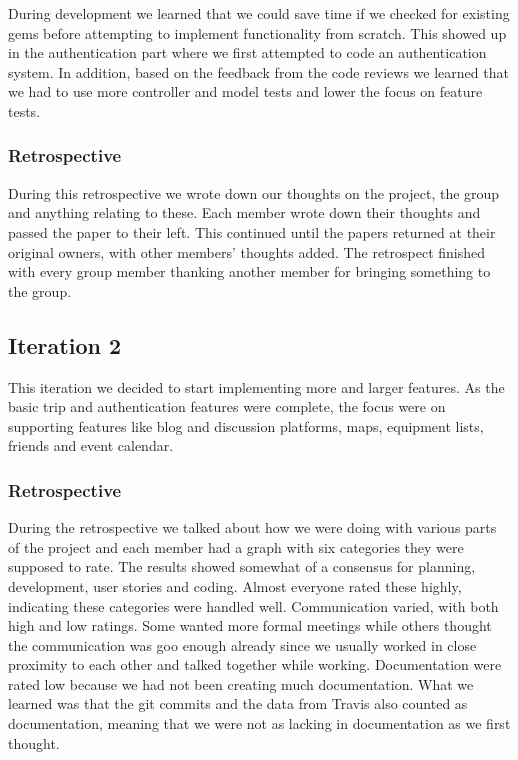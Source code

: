 \documentclass[a4paper]{article}
\begin{document}
\noindent
During development we learned that we could save time if we checked for existing gems before attempting to implement functionality from scratch. This showed up in the authentication part where we first attempted to code an authentication system. In addition, based on the feedback from the code reviews we learned that we had to use more controller and model tests and lower the focus on feature tests.

\subsubsection{Retrospective}
During this retrospective we wrote down our thoughts on the project, the group and anything relating to these. Each member wrote down their thoughts and passed the paper to their left. This continued until the papers returned at their original owners, with other members' thoughts added. The retrospect finished with every group member thanking another member for bringing something to the group.

\subsection{Iteration 2}
This iteration we decided to start implementing more and larger features. As the basic trip and authentication features were complete, the focus were on supporting features like blog and discussion platforms, maps, equipment lists, friends and event calendar.

\subsubsection{Retrospective}
During the retrospective we talked about how we were doing with various parts of the project and each member had a graph with six categories they were supposed to rate. The results showed somewhat of a consensus for planning, development, user stories and coding. Almost everyone rated these highly, indicating these categories were handled well. Communication varied, with both high and low ratings. Some wanted more formal meetings while others thought the communication was goo enough already since we usually worked in close proximity to each other and talked together while working. Documentation were rated low because we had not been creating much documentation. What we learned was that the git commits and the data from Travis also counted as documentation, meaning that we were not as lacking in documentation as we first thought.
\end{document}
